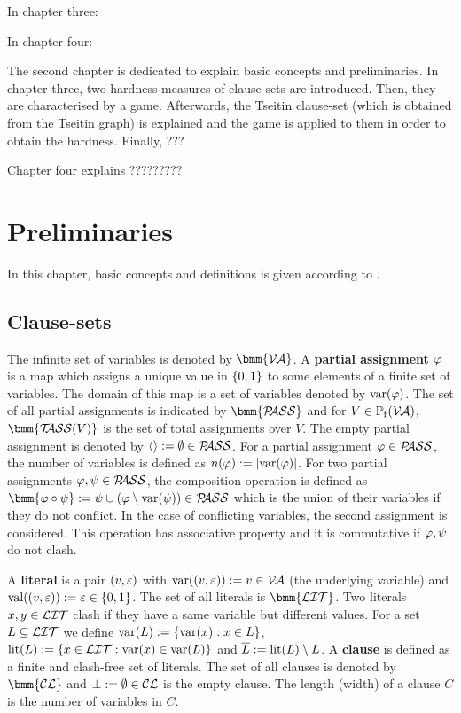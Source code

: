 \documentclass{report}
\begin{document}
In chapter three:

In chapter four: 

The second chapter is dedicated to explain basic concepts and preliminaries. In chapter three, two hardness measures of clause-sets are introduced. Then, they are characterised by a game. Afterwards, the Tseitin clause-set (which is obtained from the Tseitin graph) is explained and the game is applied to them in order to obtain the hardness. Finally, ???

Chapter four explains ?????????

\chapter{Preliminaries}
\label{cha:Preliminaries}

In this chapter, basic concepts and definitions is given according to \cite{GwynneKullmann2013GoodRepresentationsIIex, BeyersdorffKullmann2014PHP,KullmannZhao2010Extremal}. 

\section{Clause-sets}
\label{sec:Clause-sets}

The infinite set of variables is denoted by $\bmm{\Va}$. A \textbf{partial assignment} $\varphi$ is a map which assigns a unique value in $\{ 0,1 \}$ to some elements of a finite set of variables. The domain of this map is a set of variables denoted by $\operatorname{var}(\varphi)$. The set of all partial assignments is indicated by $\bmm{\Pass}$ and for $V \in \operatorname{\mathbb{P}_f}(\mathcal{V\hspace{-0.1em}A})$, $\bmm{\Tass(V)}$ is the set of total assignments over $V$. The empty partial assignment is denoted by $\langle  \rangle:= \emptyset \in \mathcal{P\hspace{-0.32em}ASS}$. For a partial assignment $\varphi \in \mathcal{P\hspace{-0.32em}ASS}$, the number of variables is defined as $n(\varphi):=\lvert \operatorname{var}(\varphi) \rvert$. For two partial assignments $\varphi, \psi \in \mathcal{P\hspace{-0.32em}ASS}$, the composition operation is defined as $\bmm{\vp \circ \psi} := \psi \cup (\vp \sm \var(\psi)) \in \Pass$ which is the union of their variables if they do not conflict. In the case of conflicting variables, the second assignment is considered. This operation has associative property and it is commutative if $\varphi, \psi$ do not clash.

A \textbf{literal} is a pair $(v,\varepsilon)$ with $\operatorname{var}((v,\varepsilon)):=v \in \mathcal{V\hspace{-0.1em}A}$ (the underlying variable) and $\operatorname{val}((v,\varepsilon)):=\varepsilon \in \{ 0,1 \}$. The set of all literals is $\bmm{\Lit}$. Two literals $x, y \in \mathcal{LIT}$ clash if they have a same variable but different values. For a set $L \subseteq \mathcal{LIT}$ we define $\operatorname{var}(L) := \{ \operatorname{var}(x) :x \in L \}$, $\operatorname{lit}(L):= \{ x \in \mathcal{LIT} : \operatorname{var}(x) \in \operatorname{var}(L) \}$ and $\overline{L} := \operatorname{lit}(L) \setminus L$. A \textbf{clause} is defined as a finite and clash-free set of literals. The set of all clauses is denoted by $\bmm{\Cl}$ and $\bot := \emptyset \in \mathcal{CL}$ is the empty clause. The length (width) of a clause $C$ is the number of variables in $C$.
\end{document}
